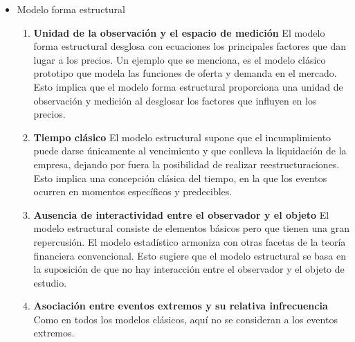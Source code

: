 \begin{problema}
\begin{sol}
\begin{itemize}

\item Modelo forma estructural
\begin{enumerate}
\item \textbf{Unidad de la observación y el espacio de medición}
El modelo forma estructural desglosa con ecuaciones los principales factores que dan lugar a los precios. Un ejemplo que se menciona, es el modelo clásico prototipo que modela las funciones de oferta y demanda en el mercado. Esto implica que el modelo forma estructural proporciona una unidad de observación y medición al desglosar los factores que influyen en los precios.
\item \textbf{Tiempo clásico}
El modelo estructural supone que el incumplimiento puede darse únicamente al vencimiento y que conlleva la liquidación de la empresa, dejando por fuera la posibilidad de realizar reestructuraciones. Esto implica una concepción clásica del tiempo, en la que los eventos ocurren en momentos específicos y predecibles.
\item \textbf{Ausencia de interactividad entre el observador y el objeto}
El modelo estructural consiste de elementos básicos pero que tienen una gran repercusión. El modelo estadístico armoniza con otras facetas de la teoría financiera convencional. Esto sugiere que el modelo estructural se basa en la suposición de que no hay interacción entre el observador y el objeto de estudio. 
\item \textbf{Asociación entre eventos extremos y su relativa infrecuencia}
Como en todos los modelos clásicos, aquí no se consideran a los eventos extremos. 
\end{enumerate}



    \end{itemize}

        
\end{sol}

\end{problema}

